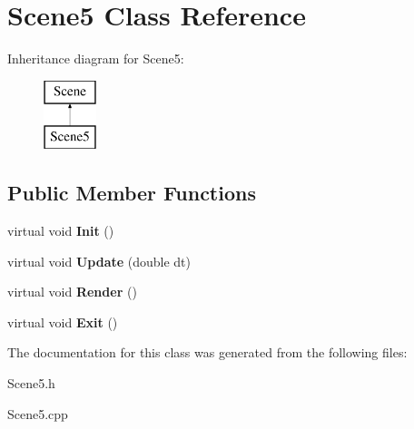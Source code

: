 \hypertarget{class_scene5}{\section{Scene5 Class Reference}
\label{class_scene5}
}
Inheritance diagram for Scene5\+:\begin{figure}[H]
\begin{center}
\leavevmode
\includegraphics[height=2.000000cm]{class_scene5}
\end{center}
\end{figure}
\subsection*{Public Member Functions}
\begin{DoxyCompactItemize}
\item 
\hypertarget{class_scene5_a3005bc4ce693f3bd956e2e5bc0a3e2eb}{virtual void {\bfseries Init} ()}\label{class_scene5_a3005bc4ce693f3bd956e2e5bc0a3e2eb}

\item 
\hypertarget{class_scene5_aed582dc4f5c2fee3d6f8937a51bf496d}{virtual void {\bfseries Update} (double dt)}\label{class_scene5_aed582dc4f5c2fee3d6f8937a51bf496d}

\item 
\hypertarget{class_scene5_af3869e6d4fd6c1be91e20642ae41f5a5}{virtual void {\bfseries Render} ()}\label{class_scene5_af3869e6d4fd6c1be91e20642ae41f5a5}

\item 
\hypertarget{class_scene5_a093e65758de039397dcb876a78fa199c}{virtual void {\bfseries Exit} ()}\label{class_scene5_a093e65758de039397dcb876a78fa199c}

\end{DoxyCompactItemize}


The documentation for this class was generated from the following files\+:\begin{DoxyCompactItemize}
\item 
Scene5.\+h\item 
Scene5.\+cpp\end{DoxyCompactItemize}
